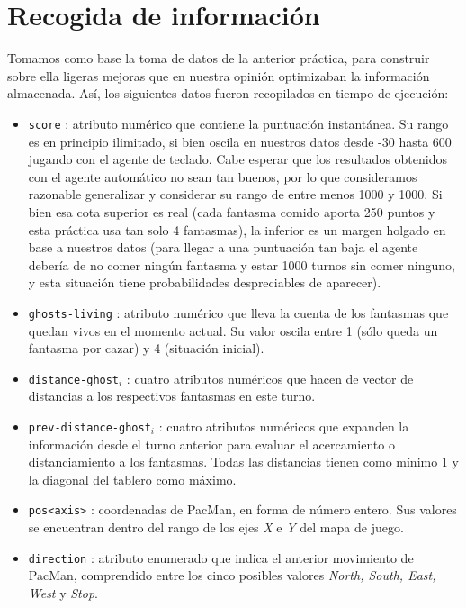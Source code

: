 \documentclass[12pt]{article}
\begin{document}
\newpage
\section{Recogida de información}


Tomamos como base la toma de datos de la anterior práctica, para construir sobre ella ligeras mejoras que en nuestra opinión optimizaban la información almacenada. Así, los siguientes datos fueron recopilados en tiempo de ejecución:

\begin{itemize}
    \item \texttt{score} : atributo numérico que contiene la puntuación instantánea. Su rango es en principio ilimitado, si bien oscila en nuestros datos desde -30 hasta 600 jugando con el agente de teclado. Cabe esperar que los resultados obtenidos con el agente automático no sean tan buenos, por lo que consideramos razonable generalizar y considerar su rango de entre menos 1000 y 1000. Si bien esa cota superior es real (cada fantasma comido aporta 250 puntos y esta práctica usa tan solo 4 fantasmas), la inferior es un margen holgado en base a nuestros datos (para llegar a una puntuación tan baja el agente debería de no comer ningún fantasma y estar 1000 turnos sin comer ninguno, y esta situación tiene probabilidades despreciables de aparecer).
    \item \texttt{ghosts-living} : atributo numérico que lleva la cuenta de los fantasmas que quedan vivos en el momento actual. Su valor oscila entre 1 (sólo queda un fantasma por cazar) y 4 (situación inicial).
    \item \texttt{distance-ghost}$_{i}$ : cuatro atributos numéricos que hacen de vector de distancias a los respectivos fantasmas en este turno.
    \item \texttt{prev-distance-ghost}$_{i}$ : cuatro atributos numéricos que expanden la información desde el turno anterior para evaluar el acercamiento o distanciamiento a los fantasmas. Todas las distancias tienen como mínimo 1 y la diagonal del tablero como máximo.
    \item \texttt{pos\textless axis\textgreater} : coordenadas de PacMan, en forma de número entero. Sus valores se encuentran dentro del rango de los ejes \emph{X} e \emph{Y} del mapa de juego.
    \item \texttt{direction} : atributo enumerado que indica el anterior movimiento de PacMan, comprendido entre los cinco posibles valores \emph{North, South, East, West} y \emph {Stop}.

\end{itemize}
\end{document}
